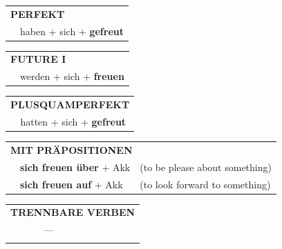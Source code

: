 \documentclass[10pt,a4paper]{revtex4-2}
\begin{document}
\begin{verbbox}
 \begin{tabular}{rl}
     \multicolumn{2}{l}{\textbf{PERFEKT}}\\
   &  haben + sich + \textbf{gefreut}\\
  \end{tabular}
\hfill
   \begin{tabular}{rl}
    \multicolumn{2}{l}{\textbf{FUTURE I} }\\
   & werden + sich + \textbf{freuen}\\
  \end{tabular}
\hfill
   \begin{tabular}{rl}
      \multicolumn{2}{l}{\textbf{PLUSQUAMPERFEKT}}\\
    & hatten + sich + \textbf{gefreut}\\
  \end{tabular}
  
\vspace{10pt}

   \begin{tabular}{lll}
      \multicolumn{3}{l}{\textbf{MIT PRÄPOSITIONEN}}\\
& \textbf{sich freuen über} + Akk & (to be please about something)\\
& \textbf{sich freuen auf} + Akk & (to look forward to something)
  \end{tabular}
  \hfill
   \begin{tabular}{lll}
      \multicolumn{3}{l}{\textbf{TRENNBARE VERBEN}}\\
      & --- & \\
\vspace{10pt}
  \end{tabular}



  \vspace{-5pt}


\end{verbbox}
\end{document}
